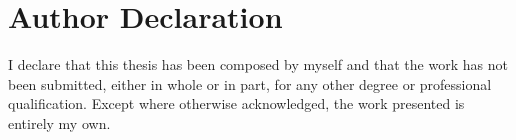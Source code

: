 \chapter*{Author Declaration}
\label{declaration}

{\setlength{\parindent}{0pt}

I declare that this thesis has been composed by myself and that the work has not been submitted, either in whole or in part, for any other degree or professional qualification. Except where otherwise acknowledged, the work presented is entirely my own.

\vspace{4cm}

\thesisauthor{}

\thesisdate{}
}

